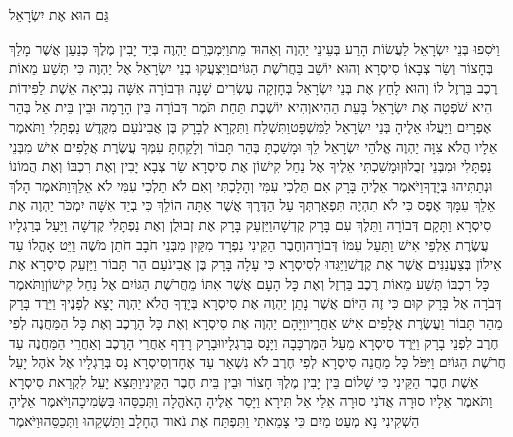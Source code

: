 \documentclass[../main/main.tex]{subfiles}
\begin{document}
\begin{multicols*}{\ncols}
גַּם הוּא אֶת יִשְׂרָאֵל\OpenSection{}\par
{}וַיֹּסִפוּ בְּנֵי יִשְׂרָאֵל לַעֲשׂוֹת הָרַע בְּעֵינֵי יַהְוֶה וְאֵהוּד מֵת\PreVerseSpace{}וַיִּמְכְּרֵם יַהְוֶה בְּיַד יָבִין מֶלֶךְ כְּנַעַן אֲשֶׁר מָלַךְ בְּחָצוֹר וְשַׂר צְבָאוֹ סִיסְרָא וְהוּא יוֹשֵׁב בַּחֲרֹשֶׁת הַגּוֹיִם\PreVerseSpace{}וַיִּצְעֲקוּ בְנֵי יִשְׂרָאֵל אֶל יַהְוֶה כִּי תְּשַׁע מֵאוֹת רֶכֶב בַּרְזֶל לוֹ וְהוּא לָחַץ אֶת בְּנֵי יִשְׂרָאֵל בְּחָזְקָה עֶשְׂרִים שָׁנָה \ClosedSection{}וּדְבוֹרָה אִשָּׁה נְבִיאָה אֵשֶׁת לַפִּידוֹת הִיא שֹׁפְטָה אֶת יִשְׂרָאֵל בָּעֵת הַהִיא\PreVerseSpace{}וְהִיא יוֹשֶׁבֶת תַּחַת תֹּמֶר דְּבוֹרָה בֵּין הָרָמָה וּבֵין בֵּית אֵל בְּהַר אֶפְרָיִם וַיַּעֲלוּ אֵלֶיהָ בְּנֵי יִשְׂרָאֵל לַמִּשְׁפָּט\PreVerseSpace{}וַתִּשְׁלַח וַתִּקְרָא לְבָרָק בֶּן אֲבִינֹעַם מִקֶּדֶשׁ נַפְתָּלִי וַתֹּאמֶר אֵלָיו הֲלֹא צִוָּה יַהְוֶה אֱלֹהֵי יִשְׂרָאֵל לֵךְ וּמָשַׁכְתָּ בְּהַר תָּבוֹר וְלָקַחְתָּ עִמְּךָ עֲשֶׂרֶת אֲלָפִים אִישׁ מִבְּנֵי נַפְתָּלִי וּמִבְּנֵי זְבֻלוּן\PreVerseSpace{}וּמָשַׁכְתִּי אֵלֶיךָ אֶל נַחַל קִישׁוֹן אֶת סִיסְרָא שַׂר צְבָא יָבִין וְאֶת רִכְבּוֹ וְאֶת הֲמוֹנוֹ וּנְתַתִּיהוּ בְּיָדֶךָ\PreVerseSpace{}וַיֹּאמֶר אֵלֶיהָ בָּרָק אִם תֵּלְכִי עִמִּי וְהָלָכְתִּי וְאִם לֹא תֵלְכִי עִמִּי לֹא אֵלֵךְ\PreVerseSpace{}וַתֹּאמֶר הָלֹךְ אֵלֵךְ עִמָּךְ אֶפֶס כִּי לֹא תִהְיֶה תִּפְאַרְתְּךָ עַל הַדֶּרֶךְ אֲשֶׁר אַתָּה הוֹלֵךְ כִּי בְיַד אִשָּׁה יִמְכֹּר יַהְוֶה אֶת סִיסְרָא וַתָּקָם דְּבוֹרָה וַתֵּלֶךְ עִם בָּרָק קֶדְשָׁה\PreVerseSpace{}וַיַּזְעֵק בָּרָק אֶת זְבוּלֻן וְאֶת נַפְתָּלִי קֶדְשָׁה וַיַּעַל בְּרַגְלָיו עֲשֶׂרֶת אַלְפֵי אִישׁ וַתַּעַל עִמּוֹ דְּבוֹרָה\PreVerseSpace{}וְחֶבֶר הַקֵּינִי נִפְרָד מִקַּיִן מִבְּנֵי חֹבָב חֹתֵן מֹשֶׁה וַיֵּט אָהֳלוֹ עַד אֵילוֹן בְּצַעֲנַנִּים\SubEnd{} אֲשֶׁר אֶת קֶדֶשׁ\PreVerseSpace{}וַיַּגִּדוּ לְסִיסְרָא כִּי עָלָה בָּרָק בֶּן אֲבִינֹעַם הַר תָּבוֹר \ClosedSection{}וַיַּזְעֵק סִיסְרָא אֶת כָּל רִכְבּוֹ תְּשַׁע מֵאוֹת רֶכֶב בַּרְזֶל וְאֶת כָּל הָעָם אֲשֶׁר אִתּוֹ מֵחֲרֹשֶׁת הַגּוֹיִם אֶל נַחַל קִישׁוֹן\PreVerseSpace{}וַתֹּאמֶר דְּבֹרָה אֶל בָּרָק קוּם כִּי זֶה הַיּוֹם אֲשֶׁר נָתַן יַהְוֶה אֶת סִיסְרָא בְּיָדֶךָ הֲלֹא יַהְוֶה יָצָא לְפָנֶיךָ וַיֵּרֶד בָּרָק מֵהַר תָּבוֹר וַעֲשֶׂרֶת אֲלָפִים אִישׁ אַחֲרָיו\PreVerseSpace{}וַיָּהָם יַהְוֶה אֶת סִיסְרָא וְאֶת כָּל הָרֶכֶב וְאֶת כָּל הַמַּחֲנֶה לְפִי חֶרֶב לִפְנֵי בָרָק וַיֵּרֶד סִיסְרָא מֵעַל הַמֶּרְכָּבָה וַיָּנָס בְּרַגְלָיו\PreVerseSpace{}וּבָרָק רָדַף אַחֲרֵי הָרֶכֶב וְאַחֲרֵי הַמַּחֲנֶה עַד חֲרֹשֶׁת הַגּוֹיִם וַיִּפֹּל כָּל מַחֲנֵה סִיסְרָא לְפִי חֶרֶב לֹא נִשְׁאַר עַד אֶחָד\PreVerseSpace{}וְסִיסְרָא נָס בְּרַגְלָיו אֶל אֹהֶל יָעֵל אֵשֶׁת חֶבֶר הַקֵּינִי כִּי שָׁלוֹם בֵּין יָבִין מֶלֶךְ חָצוֹר וּבֵין בֵּית חֶבֶר הַקֵּינִי\PreVerseSpace{}וַתֵּצֵא יָעֵל לִקְרַאת סִיסְרָא וַתֹּאמֶר אֵלָיו סוּרָה אֲדֹנִי סוּרָה אֵלַי אַל תִּירָא וַיָּסַר אֵלֶיהָ הָאֹהֱלָה וַתְּכַסֵּהוּ בַּשְּׂמִיכָה\PreVerseSpace{}וַיֹּאמֶר אֵלֶיהָ הַשְׁקִינִי נָא מְעַט מַיִם כִּי צָמֵאתִי וַתִּפְתַּח אֶת נֹאוד הֶחָלָב וַתַּשְׁקֵהוּ וַתְּכַסֵּהוּ\PreVerseSpace{}וַיֹּאמֶר 
\end{multicols*}
\end{document}
